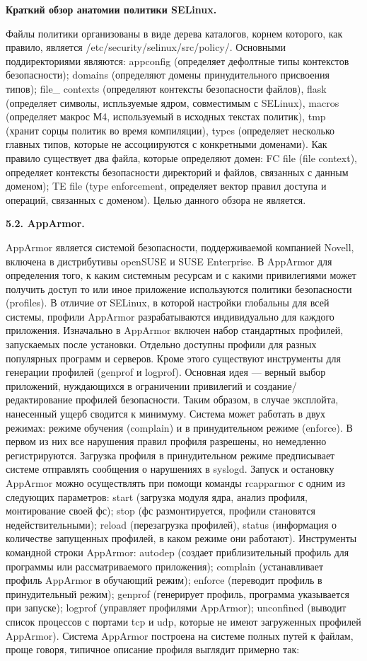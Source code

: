\bigskip
{\bfseries Краткий обзор анатомии политики SELinux.}

Файлы политики организованы в виде дерева каталогов, корнем которого, как правило, является /etc/security/selinux/src/policy/. Основными поддиректориями являются: appconfig (определяет дефолтные типы контекстов безопасности); domains (определяют домены принудительного присвоения типов); file\_ contexts (определяют контексты безопасности файлов), flask (определяет символы, испльзуемые ядром, совместимым с SELinux), macros (определяет макрос М4, используемый в исходных текстах политик), tmp (хранит сорцы политик во время компиляции), types (определяет несколько главных типов, которые не ассоциируются с конкретными доменами). Как правило существует два файла, которые определяют домен: FC file (file context), определяет контексты безопасности директорий и файлов, связанных с данным доменом); TE file (type enforcement, определяет вектор правил доступа и операций, связанных с доменом). Целью данного обзора не является. 

\bigskip
{\bfseries 5.2. AppArmor.}

AppArmor является системой безопасности, поддерживаемой компанией Novell, включена в дистрибутивы openSUSE и SUSE Enterprise. В AppArmor для определения того, к каким системным ресурсам и с какими привилегиями может получить доступ то или иное приложение используются политики безопасности (profiles). В отличие от SELinux, в которой настройки глобальны для всей системы, профили AppArmor разрабатываются индивидуально для каждого приложения. Изначально в AppArmor включен набор стандартных профилей, запускаемых после установки. Отдельно доступны профили для разных популярных программ и серверов. Кроме этого существуют инструменты для генерации профилей (genprof и logprof). Основная идея — верный выбор приложений, нуждающихся в ограничении привилегий и создание/редактирование профилей безопасности. Таким образом, в случае эксплойта, нанесенный ущерб сводится к минимуму. Система может работать в двух режимах: режиме обучения (complain) и в принудительном режиме (enforce). В первом из них все нарушения правил профиля разрешены, но немедленно регистрируются. Загрузка профиля в принудительном режиме предписывает системе отправлять сообщения о нарушениях в syslogd. Запуск и остановку AppArmor можно осуществлять при помощи команды rcapparmor с одним из следующих параметров: start (загрузка модуля ядра, анализ профиля, монтирование своей фс); stop (фс размонтируется, профили становятся недействительными); reload (перезагрузка профилей), status (информация о количестве запущенных профилей, в каком режиме они работают). Инструменты командной строки AppArmor: autodep (создает приблизительный профиль для программы или рассматриваемого приложения); complain (устанавливает профиль AppArmor в обучающий режим); enforce (переводит профиль в принудительный режим); genprof (генерирует профиль, программа указывается при запуске); logprof (управляет профилями AppArmor); unconfined (выводит список процессов с портами tcp и udp, которые не имеют загруженных профилей AppArmor). Система AppArmor построена на системе полных путей к файлам, проще говоря, типичное описание профиля выглядит примерно так: 

